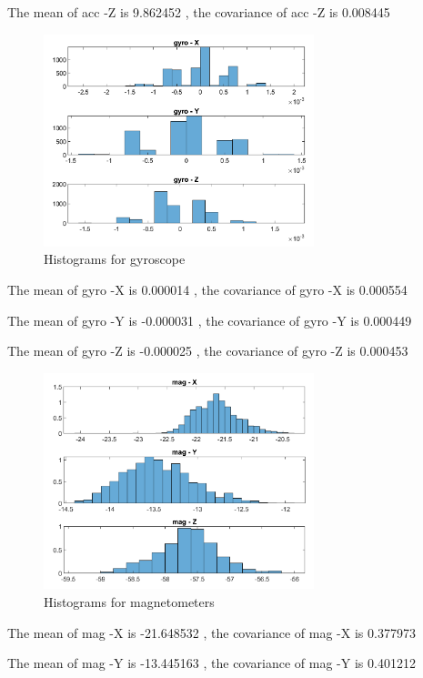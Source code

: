 The mean of acc -Z is 9.862452 , the covariance of acc -Z is 0.008445 

\begin{figure}[H]
 \centering
 \includegraphics[width=0.7\textwidth]{images/histogramgyroscope.png}
 \caption{Histograms for gyroscope}
 \label{hisgyro}
\end{figure}


The mean of gyro -X is 0.000014 
, the covariance of gyro -X is 0.000554  

The mean of gyro -Y is -0.000031 
, the covariance of gyro -Y is 0.000449 

The mean of gyro -Z is -0.000025 
, the covariance of gyro -Z is 0.000453 

\begin{figure}[H]
 \centering
 \includegraphics[width=0.7\textwidth]{images/hismagnetometer.png}
 \caption{Histograms for magnetometers}
 \label{hismag}
\end{figure}

The mean of mag -X is -21.648532 
, the covariance of mag -X is 0.377973  

The mean of mag -Y is -13.445163 
, the covariance of mag -Y is 0.401212 

